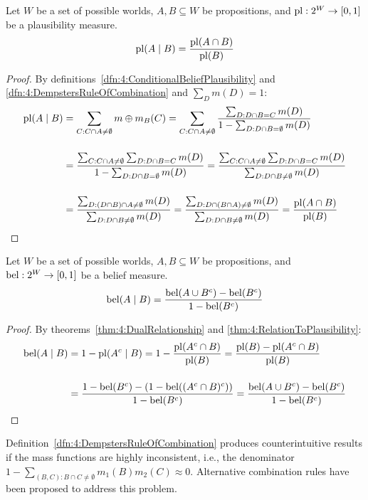\begin{thm}
  \label{thm:4:RelationToPlausibility}
  Let $W$ be a set of possible worlds, $A, B \subseteq W$ be propositions, and
  $\operatorname*{pl} : 2^W \to [0, 1]$ be a plausibility measure.
  \begin{equation}
    \label{eqn:4:RelationToPlausibility}
    \operatorname*{pl}(A \mid B) = \frac{\operatorname*{pl}(A \cap B)}{\operatorname*{pl}(B)}
  \end{equation}
  \begin{proof}
    By definitions~\ref{dfn:4:ConditionalBeliefPlausibility} and
    \ref{dfn:4:DempstersRuleOfCombination} and $\sum_D m(D) = 1$:
    \begin{align*}
      \operatorname*{pl}(A \mid B)
       & = \sum_{C : C \cap A \neq \emptyset} m \oplus m_B(C)
      = \sum_{C : C \cap A \neq \emptyset} \frac{\sum_{D : D \cap B = C} m(D)}{1 - \sum_{D : D \cap B = \emptyset} m(D)}
      \\[3ex]
       & = \frac{\sum_{C : C \cap A \neq \emptyset} \sum_{D : D \cap B = C} m(D)}{1 - \sum_{D : D \cap B = \emptyset} m(D)}
      =  \frac{\sum_{C : C \cap A \neq \emptyset} \sum_{D : D \cap B = C} m(D)}{\sum_{D : D \cap B \neq \emptyset} m(D)}
      \\[3ex]
       & = \frac{\sum_{D : (D \cap B) \cap A \neq \emptyset} m(D)}{\sum_{D : D \cap B \neq \emptyset} m(D)}
      = \frac{\sum_{D : D \cap (B \cap A) \neq \emptyset} m(D)}{\sum_{D : D \cap B \neq \emptyset} m(D)}
      = \frac{\operatorname*{pl}(A \cap B)}{\operatorname*{pl}(B)}
    \end{align*}
  \end{proof}
\end{thm}

\begin{thm}
  Let $W$ be a set of possible worlds, $A, B \subseteq W$ be propositions, and
  $\operatorname*{bel} : 2^W \to [0, 1]$ be a belief measure.
  \begin{equation}
    \label{eqn:4:RelationToBelief}
    \operatorname*{bel}(A \mid B) = \frac{\operatorname*{bel}(A \cup B^c) - \operatorname*{bel}(B^c)}{1 - \operatorname*{bel}(B^c)}
  \end{equation}
  \begin{proof}
    By theorems~\ref{thm:4:DualRelationship} and
    \ref{thm:4:RelationToPlausibility}:
    \begin{align*}
      \operatorname*{bel}(A \mid B)
       & = 1 - \operatorname*{pl}(A^c \mid B)
      = 1 - \frac{\operatorname*{pl}(A^c \cap B)}{\operatorname*{pl}(B)}
      = \frac{\operatorname*{pl}(B) - \operatorname*{pl}(A^c \cap B)}{\operatorname*{pl}(B)}
      \\[3ex]
       & = \frac{1 - \operatorname*{bel}(B^c) - (1 - \operatorname*{bel}((A^c \cap B)^c))}{1 - \operatorname*{bel}(B^c)}
      = \frac{\operatorname*{bel}(A \cup B^c) - \operatorname*{bel}(B^c)}{1 - \operatorname*{bel}(B^c)}
    \end{align*}
  \end{proof}
\end{thm}

Definition~\ref{dfn:4:DempstersRuleOfCombination} produces counterintuitive
results if the mass functions are highly inconsistent, i.e., the denominator $1
  - \sum_{(B, C) : B \cap C \neq \emptyset} m_1(B) m_2(C) \approx 0$.
Alternative combination rules have been proposed to address this problem.
